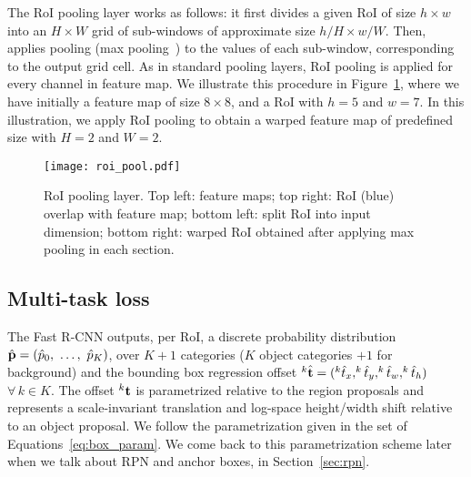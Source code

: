 The RoI pooling layer works as follows:
it first divides a given RoI of size $h\times w$ into an $H\times W$ grid of sub-windows of approximate size $h/H \times w/W$.
Then, applies pooling (\eg max pooling~\cite{goodfellow2016}) to the values of each sub-window, corresponding to the output grid cell.
As in standard pooling layers, RoI pooling is applied for every channel in feature map.
We illustrate this procedure in Figure~\ref{fig:roi_pool}, where we have initially a feature map of size $8\times8$, and a RoI with $h=5$ and $w=7$.
In this illustration, we apply RoI pooling to obtain a warped feature map of predefined size with $H=2$ and $W=2$.
%
\begin{figure}[th!]
	\centering
	\texttt{[image: roi\_pool.pdf]}
	\caption[RoI pooling layer]{RoI pooling layer.
	Top left: feature maps;
	top right: RoI (blue) overlap with feature map;
	bottom left: split RoI into input dimension;
	bottom right: warped RoI obtained after applying max pooling in each section.
	}
	\label{fig:roi_pool}
\end{figure}

\subsection{Multi-task loss}\label{sec:fast_r-cnn_loss}
%
The Fast R-CNN outputs, per RoI, a discrete probability distribution $\hat {\mathbf{p}} = (\hat p_0,~\dots,~\hat p_K)$, over $K+1$ categories ($K$ object categories $+ 1$ for background) and the bounding box regression offset $^{k}\hat{\mathbf{t}} = (^{k}\hat t_{x}, ^{k}\hat t_{y}, ^{k}\hat t_{w}, ^{k}\hat t_{h})$ $\forall\,k \in K$.
The offset $^{k}\mathbf{t}$ is parametrized relative to the region proposals and represents a scale-invariant  translation and log-space height/width shift relative to an object proposal.
We follow the parametrization given in the set of Equations~\eqref{eq:box_param}.
We come back to this parametrization scheme later when we talk about RPN and anchor boxes, in Section~\ref{sec:rpn}.

